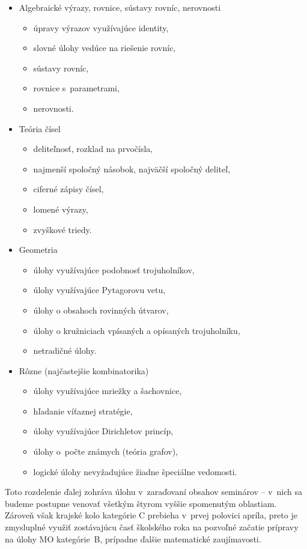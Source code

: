 \begin{itemize}
\item Algebraické výrazy, rovnice, sústavy rovníc, nerovnosti
\begin{itemize}
\item úpravy výrazov využívajúce identity,
\item slovné úlohy vedúce na riešenie rovníc,
\item sústavy rovníc,
\item rovnice s~parametrami,
\item nerovnosti.
\end{itemize}
\item Teória čísel
\begin{itemize}
\item deliteľnosť, rozklad na prvočísla,
\item najmenší spoločný násobok, najväčší spoločný deliteľ,
\item ciferné zápisy čísel,
\item lomené výrazy,
\item zvyškové triedy.
\end{itemize}
\item Geometria
\begin{itemize}
\item úlohy využívajúce podobnosť trojuholníkov,
\item úlohy využívajúce Pytagorovu vetu,
\item úlohy o obsahoch rovinných útvarov,
\item úlohy o kružniciach vpísaných a opísaných trojuholníku,
\item netradičné úlohy.
\end{itemize}
\item Rôzne (najčastejšie kombinatorika)
\begin{itemize}
\item úlohy využívajúce mriežky a šachovnice,
\item hľadanie víťaznej stratégie,
\item úlohy využívajúce Dirichletov princíp,
\item úlohy o~počte známych (teória grafov),
\item logické úlohy nevyžadujúce žiadne špeciálne vedomosti.
\end{itemize}
\end{itemize}


Toto rozdelenie ďalej zohráva úlohu v~zaraďovaní obsahov seminárov -- v~nich sa budeme postupne venovať všetkým štyrom vyššie spomenutým oblastiam. Zároveň však krajské kolo kategórie C prebieha v~prvej polovici apríla, preto je zmysluplné využiť zostávajúcu časť školského roka na pozvoľné začatie prípravy na úlohy MO kategórie~B, prípadne ďalšie matematické zaujímavosti.

